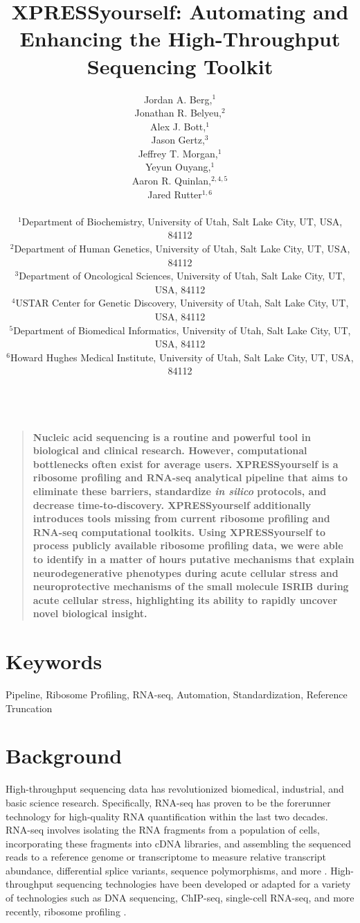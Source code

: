 \documentclass[11pt, a4paper, oneside]{article}
\title{
XPRESSyourself: Automating and Enhancing the High-Throughput Sequencing Toolkit
}
\author{
Jordan A. Berg,$^{1}$ \\
Jonathan R. Belyeu,$^{2}$ \\
Alex J. Bott,$^{1}$ \\
Jason Gertz,$^{3}$ \\
Jeffrey T. Morgan,$^{1}$ \\
Yeyun Ouyang,$^{1}$ \\
Aaron R. Quinlan,$^{2,4,5}$ \\
Jared Rutter$^{1,6}$ \\
\\
\normalsize{$^{1}$Department of Biochemistry, University of Utah, Salt Lake City, UT, USA, 84112}\\
\normalsize{$^{2}$Department of Human Genetics, University of Utah, Salt Lake City, UT, USA, 84112}\\
\normalsize{$^{3}$Department of Oncological Sciences, University of Utah, Salt Lake City, UT, USA, 84112}\\
\normalsize{$^{4}$USTAR Center for Genetic Discovery, University of Utah, Salt Lake City, UT, USA, 84112}\\
\normalsize{$^{5}$Department of Biomedical Informatics, University of Utah, Salt Lake City, UT, USA, 84112}\\
\normalsize{$^{6}$Howard Hughes Medical Institute, University of Utah, Salt Lake City, UT, USA, 84112}\\
\\
}
\date{}
\newenvironment{sciabstract}{%
\begin{quote} \bf}
{\end{quote}}
\begin{document}
\baselineskip24pt

\maketitle



\begin{sciabstract}
Nucleic acid sequencing is a routine and powerful tool in biological and clinical research. However, computational bottlenecks often exist for average users. XPRESSyourself is a ribosome profiling and RNA-seq analytical pipeline that aims to eliminate these barriers, standardize \textit{in silico} protocols, and decrease time-to-discovery. XPRESSyourself additionally introduces tools missing from current ribosome profiling and RNA-seq computational toolkits. Using XPRESSyourself to process publicly available ribosome profiling data, we were able to identify in a matter of hours putative mechanisms that explain neurodegenerative phenotypes during acute cellular stress and neuroprotective mechanisms of the small molecule ISRIB during acute cellular stress, highlighting its ability to rapidly uncover novel biological insight.
\end{sciabstract}

\section*{Keywords}
Pipeline, Ribosome Profiling, RNA-seq, Automation, Standardization, Reference Truncation

\section{Background}
High-throughput sequencing data has revolutionized biomedical, industrial, and basic science research. Specifically, RNA-seq has proven to be the forerunner technology for high-quality RNA quantification within the last two decades. RNA-seq involves isolating the RNA fragments from a population of cells, incorporating these fragments into cDNA libraries, and assembling the sequenced reads to a reference genome or transcriptome to measure relative transcript abundance, differential splice variants, sequence polymorphisms, and more \cite{byron_nrg}. High-throughput sequencing technologies have been developed or adapted for a variety of technologies such as DNA sequencing, ChIP-seq, single-cell RNA-seq, and more recently, ribosome profiling \cite{ingolia_science}. \par
\end{document}
